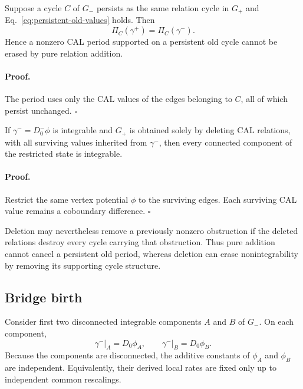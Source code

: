 \begin{proposition}
\label{prop:persistent-obstruction}
Suppose a cycle $C$ of $G_-$ persists as the same relation cycle in $G_+$ and Eq.~\eqref{eq:persistent-old-values} holds. Then
\begin{equation}
\Pi_C(\gamma^+)=\Pi_C(\gamma^-).
\end{equation}
Hence a nonzero CAL period supported on a persistent old cycle cannot be erased by pure relation addition.
\end{proposition}

\paragraph*{Proof.}
The period uses only the CAL values of the edges belonging to $C$, all of which persist unchanged. \hfill$\square$

\begin{proposition}
\label{prop:deletion-integrability}
If $\gamma^-=D_0^-\phi$ is integrable and $G_+$ is obtained solely by deleting CAL relations, with all surviving values inherited from $\gamma^-$, then every connected component of the restricted state is integrable.
\end{proposition}

\paragraph*{Proof.}
Restrict the same vertex potential $\phi$ to the surviving edges. Each surviving CAL value remains a coboundary difference. \hfill$\square$

Deletion may nevertheless remove a previously nonzero obstruction if the deleted relations destroy every cycle carrying that obstruction. Thus pure addition cannot cancel a persistent old period, whereas deletion can erase nonintegrability by removing its supporting cycle structure.

\subsection{Bridge birth}

Consider first two disconnected integrable components $A$ and $B$ of $G_-$. On each component,
\begin{equation}
\gamma^-\big|_A=D_0\phi_A,
\qquad
\gamma^-\big|_B=D_0\phi_B.
\end{equation}
Because the components are disconnected, the additive constants of $\phi_A$ and $\phi_B$ are independent. Equivalently, their derived local rates are fixed only up to independent common rescalings.


